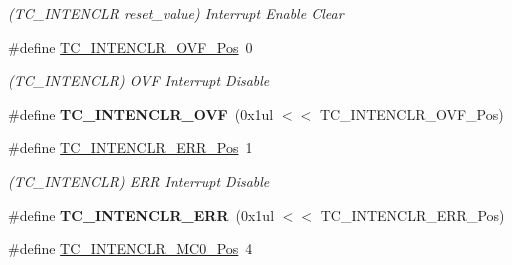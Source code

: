 \begin{DoxyCompactItemize}
\begin{DoxyCompactList}\small\item\em (T\+C\+\_\+\+I\+N\+T\+E\+N\+C\+L\+R reset\+\_\+value) Interrupt Enable Clear \end{DoxyCompactList}\item 
\hypertarget{group___s_a_m_l21___t_c_ga74cbe71f7dbc163c15de8e2fcc1f19d1}{}\#define \hyperlink{group___s_a_m_l21___t_c_ga74cbe71f7dbc163c15de8e2fcc1f19d1}{T\+C\+\_\+\+I\+N\+T\+E\+N\+C\+L\+R\+\_\+\+O\+V\+F\+\_\+\+Pos}~0\label{group___s_a_m_l21___t_c_ga74cbe71f7dbc163c15de8e2fcc1f19d1}

\begin{DoxyCompactList}\small\item\em (T\+C\+\_\+\+I\+N\+T\+E\+N\+C\+L\+R) O\+V\+F Interrupt Disable \end{DoxyCompactList}\item 
\hypertarget{group___s_a_m_l21___t_c_ga7117cd9050a757317fe9a4e8b6f40002}{}\#define {\bfseries T\+C\+\_\+\+I\+N\+T\+E\+N\+C\+L\+R\+\_\+\+O\+V\+F}~(0x1ul $<$$<$ T\+C\+\_\+\+I\+N\+T\+E\+N\+C\+L\+R\+\_\+\+O\+V\+F\+\_\+\+Pos)\label{group___s_a_m_l21___t_c_ga7117cd9050a757317fe9a4e8b6f40002}

\item 
\hypertarget{group___s_a_m_l21___t_c_gaa535ab7c7866edbd10a55444ea5aec5a}{}\#define \hyperlink{group___s_a_m_l21___t_c_gaa535ab7c7866edbd10a55444ea5aec5a}{T\+C\+\_\+\+I\+N\+T\+E\+N\+C\+L\+R\+\_\+\+E\+R\+R\+\_\+\+Pos}~1\label{group___s_a_m_l21___t_c_gaa535ab7c7866edbd10a55444ea5aec5a}

\begin{DoxyCompactList}\small\item\em (T\+C\+\_\+\+I\+N\+T\+E\+N\+C\+L\+R) E\+R\+R Interrupt Disable \end{DoxyCompactList}\item 
\hypertarget{group___s_a_m_l21___t_c_gadd3d5e6361ee0efa75267010f4965036}{}\#define {\bfseries T\+C\+\_\+\+I\+N\+T\+E\+N\+C\+L\+R\+\_\+\+E\+R\+R}~(0x1ul $<$$<$ T\+C\+\_\+\+I\+N\+T\+E\+N\+C\+L\+R\+\_\+\+E\+R\+R\+\_\+\+Pos)\label{group___s_a_m_l21___t_c_gadd3d5e6361ee0efa75267010f4965036}

\item 
\hypertarget{group___s_a_m_l21___t_c_ga04317541f61352516d78133796dd3dfc}{}\#define \hyperlink{group___s_a_m_l21___t_c_ga04317541f61352516d78133796dd3dfc}{T\+C\+\_\+\+I\+N\+T\+E\+N\+C\+L\+R\+\_\+\+M\+C0\+\_\+\+Pos}~4\label{group___s_a_m_l21___t_c_ga04317541f61352516d78133796dd3dfc}


\end{DoxyCompactItemize}
